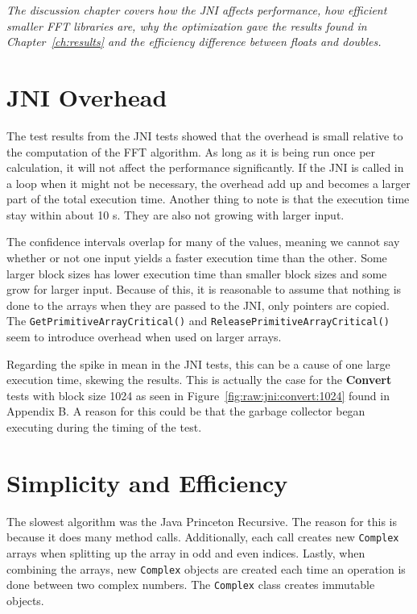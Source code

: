 \textit{The discussion chapter covers how the JNI affects performance, how efficient smaller FFT libraries are, why the optimization gave the results found in Chapter~\ref{ch:results} and the efficiency difference between floats and doubles.}

\section{JNI Overhead}
The test results from the JNI tests showed that the overhead is small relative to the computation of the FFT algorithm. As long as it is being run once per calculation, it will not affect the performance significantly. If the JNI is called in a loop when it might not be necessary, the overhead add up and becomes a larger part of the total execution time. Another thing to note is that the execution time stay within about 10 \textmu s. They are also not growing with larger input.

The confidence intervals overlap for many of the values, meaning we cannot say whether or not one input yields a faster execution time than the other. Some larger block sizes has lower execution time than smaller block sizes and some grow for larger input. Because of this, it is reasonable to assume that nothing is done to the arrays when they are passed to the JNI, only pointers are copied. The \texttt{GetPrimitiveArrayCritical()} and \texttt{ReleasePrimitiveArrayCritical()} seem to introduce overhead when used on larger arrays. %

Regarding the spike in mean in the JNI tests, this can be a cause of one large execution time, skewing the results. This is actually the case for the \textbf{Convert} tests with block size 1024 as seen in Figure~\ref{fig:raw:jni:convert:1024} found in Appendix B. A reason for this could be that the garbage collector began executing during the timing of the test.


\section{Simplicity and Efficiency} %

The slowest algorithm was the Java Princeton Recursive. The reason for this is because it does many method calls. Additionally, each call creates new \texttt{Complex} arrays when splitting up the array in odd and even indices. Lastly, when combining the arrays, new \texttt{Complex} objects are created each time an operation is done between two complex numbers. The \texttt{Complex} class creates immutable objects.

